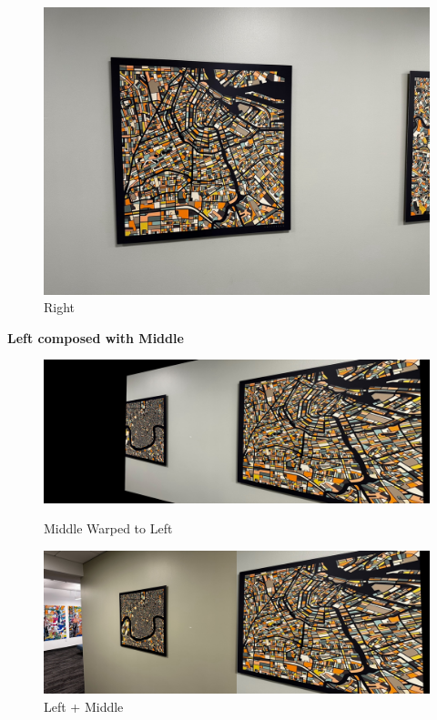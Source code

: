 \begin{figure}[H]
\begin{minipage}{0.29\textwidth}
    \includegraphics[width=\textwidth]{images/right.jpg}
    \caption{Right}
    \label{fig:hp-cover}
  \end{minipage}
\end{figure}

\textbf{Left composed with Middle}
\begin{figure}[H]
  \centering
  \begin{minipage}{0.79\textwidth}
    \includegraphics[width=\textwidth]{images/warped-right-1.jpg}
    \caption{Middle Warped to Left}
    \label{fig:cv-desk}
  \end{minipage}
  \hfill
  \begin{minipage}{0.79\textwidth}
    \includegraphics[width=\textwidth]{images/panorama-1.jpg}
    \caption{Left + Middle}
    \label{fig:hp-desk}
  \end{minipage}
\end{figure}

